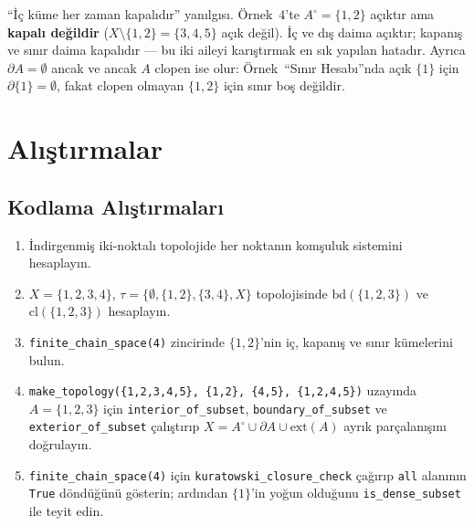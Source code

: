 \begin{karsiornek}
``İç küme her zaman kapalıdır'' yanılgısı. Örnek~4'te $A^\circ=\{1,2\}$ açıktır ama
\textbf{kapalı değildir} ($X\setminus\{1,2\}=\{3,4,5\}$ açık değil). İç ve dış daima
açıktır; kapanış ve sınır daima kapalıdır --- bu iki aileyi karıştırmak en sık yapılan
hatadır. Ayrıca $\partial A=\emptyset$ ancak ve ancak $A$ clopen ise olur: Örnek~``Sınır
Hesabı''nda açık $\{1\}$ için $\partial\{1\}=\emptyset$, fakat clopen olmayan $\{1,2\}$
için sınır boş değildir.
\end{karsiornek}

\section{Alıştırmalar}

\subsection*{Kodlama Alıştırmaları}
\begin{enumerate}[label=\textbf{K\arabic*.}]
  \item İndirgenmiş iki-noktalı topolojide her noktanın komşuluk sistemini hesaplayın.
  \item $X = \{1,2,3,4\}$, $\tau = \{\emptyset, \{1,2\}, \{3,4\}, X\}$ topolojisinde
        $\mathrm{bd}(\{1,2,3\})$ ve $\mathrm{cl}(\{1,2,3\})$ hesaplayın.
  \item \texttt{finite\_chain\_space(4)} zincirinde $\{1,2\}$'nin iç, kapanış ve sınır
        kümelerini bulun.
  \item \texttt{make\_topology(\{1,2,3,4,5\}, \{1,2\}, \{4,5\}, \{1,2,4,5\})} uzayında
        $A=\{1,2,3\}$ için \texttt{interior\_of\_subset}, \texttt{boundary\_of\_subset} ve
        \texttt{exterior\_of\_subset} çalıştırıp $X = A^\circ \cup \partial A \cup
        \mathrm{ext}(A)$ ayrık parçalanışını doğrulayın.
  \item \texttt{finite\_chain\_space(4)} için \texttt{kuratowski\_closure\_check} çağırıp
        \texttt{all} alanının \texttt{True} döndüğünü gösterin; ardından $\{1\}$'in yoğun
        olduğunu \texttt{is\_dense\_subset} ile teyit edin.
\end{enumerate}

